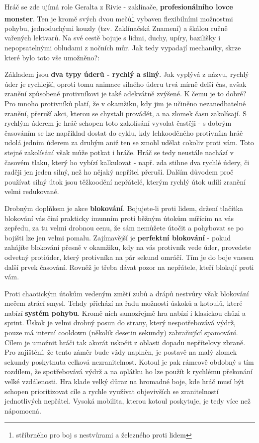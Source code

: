 Hráč se zde ujímá role Geralta z Rivie - zaklínače, \textbf{profesionálního lovce monster}. Ten je kromě svých dvou mečů\footnote{stříbrného pro boj s nestvůrami a železného proti lidem} vybaven flexibilními možnostmi pohybu, jednoduchými kouzly (tzv. Zaklínačská Znamení) a škálou ručně vařených lektvarů. Na své cestě bojuje s lidmi, duchy, upíry, bazilišky i nepopsatelnými obludami z nočních můr.
Jak tedy vypadají mechaniky, skrze které bylo toto vše umožněno?:
\bigbreak

Základem jsou \textbf{dva typy úderů - rychlý a silný}. Jak vyplývá z názvu, rychlý úder je rychlejší, oproti tomu animace silného úderu trvá mírně delší čas, avšak zranění způsobené protivníkovi je také adekvátně zvýšené. K čemu je to dobré? Pro mnoho protivníků platí, že v okamžiku, kdy jim je učiněno nezanedbatelné zranění, přeruší akci, kterou se chystali provádět, a na zlomek času zakolísají. S rychlým úderem je hráč schopen toto zakolísání vyvolat častěji - s dobrým časováním se lze například dostat do cyklu, kdy lehkooděného protivníka hráč udolá jedním úderem za druhým aniž ten se zmohl udělat cokoliv proti vám. Toto stejné zakolísání však může potkat i hráče. Hráč se tedy neustále nachází v časovém tlaku, který ho vybízí kalkulovat - např. zda stihne dva rychlé údery, či raději jen jeden silný, než ho nějaký nepřítel přeruší. Dalším důvodem proč používat silný útok jsou těžkoodění nepřátelé, kterým rychlý útok udílí zranění velmi redukované. 

Drobným doplňkem je akce \textbf{blokování}. Bojujete-li proti lidem, držení tlačítka blokování vás činí prakticky imunním proti běžným útokům mířícím na vás zepředu, za tu velmi drobnou cenu, že sám nemůžete útočit a pohybovat se po bojišti lze jen velmi pomalu. Zajímavější je \textbf{perfektní blokování} - pokud zahájíte blokování přesně v okamžiku, kdy na vás protivník vede úder, provedete odvetný protiúder, který protivníka na pár sekund omráčí. Tím je do boje vnesen další prvek časování. Rovněž je třeba dávat pozor na nepřátele, kteří blokují proti vám.

Proti chaotickým útokům vedeným změtí zubů a drápů nestvůry však blokování mečem ztrácí smysl. Tehdy přichází na řadu možnosti úskoků a kotoulů, které nabízí \textbf{systém pohybu}. Kromě nich samozřejmě hra nabízí i klasickou chůzi a sprint. Úskok je velmi drobný posun do strany, který nespotřebovává výdrž, pouze má interní cooldown (několik desetin sekundy) zabraňující spamování. Cílem je umožnit hráči tak akorát uskočit z oblasti dopadu nepřítelovy zbraně. Pro zajištění, že tento záměr bude vždy naplněn, je postavě na malý zlomek sekundy poskytnuta celková nezranitelnost. Kotoul je pak rámcově obdobný s tím rozdílem, že spotřebovává výdrž a na oplátku ho lze použít k rychlému překonání velké vzdálenosti. Hra klade velký důraz na hromadné boje, kde hráč musí být schopen prioritizovat cíle a rychle využívat objevivších se zranitelností jednotlivých nepřátel. Vysoká mobilita, kterou kotoul poskytuje, je tedy více než nápomocná.  

